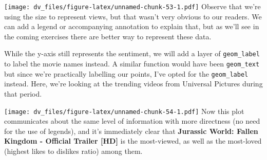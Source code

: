 \documentclass[]{article}
\newenvironment{Shaded}{\begin{snugshade}}{\end{snugshade}}
\newcommand{\DataTypeTok}[1]{\textcolor[rgb]{0.13,0.29,0.53}{#1}}
\newcommand{\DecValTok}[1]{\textcolor[rgb]{0.00,0.00,0.81}{#1}}
\newcommand{\KeywordTok}[1]{\textcolor[rgb]{0.13,0.29,0.53}{\textbf{#1}}}
\newcommand{\NormalTok}[1]{#1}
\newcommand{\OperatorTok}[1]{\textcolor[rgb]{0.81,0.36,0.00}{\textbf{#1}}}
\newcommand{\StringTok}[1]{\textcolor[rgb]{0.31,0.60,0.02}{#1}}
\begin{document}
\texttt{[image: dv\_files/figure-latex/unnamed-chunk-53-1.pdf]} Observe
that we're using the size to represent views, but that wasn't very
obvious to our readers. We can add a legend or accompanying annotation
to explain that, but as we'll see in the coming exercises there are
better way to represent these data.

While the y-axis still represents the sentiment, we will add a layer of
\texttt{geom\_label} to label the movie names instead. A similar
function would have been \texttt{geom\_text} but since we're practically
labelling our points, I've opted for the \texttt{geom\_label} instead.
Here, we're looking at the trending videos from Universal Pictures
during that period.

\begin{Shaded}
\end{Shaded}

\texttt{[image: dv\_files/figure-latex/unnamed-chunk-54-1.pdf]} Now this
plot communicates about the same level of information with more
directness (no need for the use of legends), and it's immediately clear
that \textbf{Jurassic World: Fallen Kingdom - Official Trailer {[}HD{]}}
is the most-viewed, as well as the most-loved (highest likes to dislikes
ratio) among them.
\end{document}
